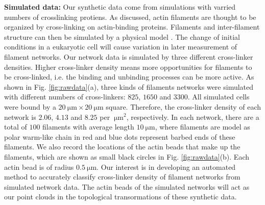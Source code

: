 \documentclass[10pt]{article}
\begin{document}
\textbf{Simulated data:}
Our synthetic data come from simulations with varried numbers of crosslinking protiens. As discussed, actin filaments are thought to be organized by cross-linking on actin-binding proteins. Filaments and inter-filament structure can then be simulated by a physical model \cite{freedman2017versatile,freedman2018nonequilibrium}. The change of initial conditions in a eukaryotic cell will cause variation in later measurement of filament networks. Our network data is simulated by three different cross-linker densities. Higher cross-linker density means more opportunities for filaments to be cross-linked, i.e. the binding and unbinding processes can be more active. As shown in Fig. \ref{fig:rawdata}(a), three kinds of filaments networks were simulated with different numbers of cross-linkers:  $825$, $1650$ and $3300$. All simulated cells were bound by a $\SI{20}{\micro\metre} \times \SI{20}{\micro\metre}$ square. Therefore, the cross-linker density of each network is $2.06$, $4.13$ and $8.25$ per $\SI{}{\micro\metre}^2$, respectively. In each network, there are a total of $100$ filaments with average length $\SI{10}{\micro\metre}$, where filaments are model as polar warm-like chain in red and blue dots represent barbed ends of these filaments. We also record the locations of the actin beads that make up the filaments, which are shown as small black circles in Fig. \ref{fig:rawdata}(b). Each actin bead is of radius $\SI{0.5}{\micro\metre}$. Our interest is in developing an automated method to accurately classify cross-linker density of filament networks from simulated network data. The actin beads of the simulated networks will act as our point clouds in the topological transormations of these synthetic data.
\end{document}
